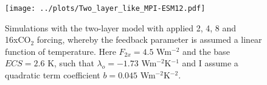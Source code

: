 \documentclass[12pt]{book}
\begin{document}

\begin{figure}
\begin{center}
\texttt{[image: ../plots/Two\_layer\_like\_MPI-ESM12.pdf]}
\end{center}
\caption{ Simulations with the two-layer model with applied 2, 4, 8 and 16xCO$_2$ forcing, whereby the feedback parameter is assumed a linear function of temperature. Here $F_{2x}=4.5$ Wm$^{-2}$ and the base $ECS=2.6$ K, such that $\lambda_o=-1.73$ Wm$^{-2}$K$^{-1}$ and I assume a quadratic term coefficient $b=0.045$ Wm$^{-2}$K$^{-2}$. } 
\label{fig:quadratic_imbalance}
\end{figure}
\end{document}
